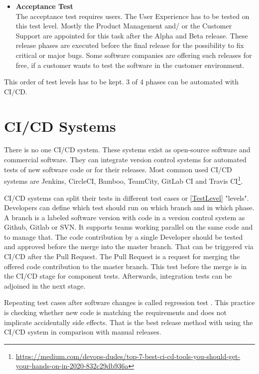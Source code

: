\begin{itemize}
\item \textbf{Acceptance Test} \\
The acceptance test requires users. The User Experience has to be tested on this test level. Mostly the Product Management and/ or the Customer Support are appointed for this task after the Alpha and Beta release. These release phases are executed before the final release for the possibility to fix critical or major bugs.
Some software companies are offering such releases for free, if a customer wants to test the software in the customer environment.
\end{itemize}
This order of test levels has to be kept. 3 of 4 phases can be automated with \gls{CI/CD}. 

\section{CI/CD Systems} \label{CI-CD}

There is no one \gls{CI/CD} system. These systems exist as open-source software and commercial software. They can integrate version control systems for automated tests of new software code or for their releases. Most common used \gls{CI/CD} systems are Jenkins, CircleCI, Bamboo, TeamCity, GitLab CI and Travis CI\footnote{\url{https://medium.com/devops-dudes/top-7-best-ci-cd-tools-you-should-get-your-hands-on-in-2020-832c29db936a}}.

\gls{CI/CD} systems can split their tests in different test cases or \ref{TestLevel} "levels". Developers can define which test should run on which branch and in which phase. A branch is a labeled software version with code in a version control system as Github, Gitlab or SVN. It supports teams working parallel on the same code and to manage that. The code contribution by a single Developer should be tested and approved before the merge into the master branch. That can be triggered via \gls{CI/CD} after the Pull Request. The Pull Request is a request for merging the offered code contribution to the master branch. This test before the merge is in the \gls{CI/CD} stage for component tests. Afterwards, integration tests can be adjoined in the next stage.

Repeating test cases after software changes is called regression test \cite[~p.98]{Spillner2019}. This practice is checking whether new code is matching the requirements and does not implicate accidentally side effects. That is the best release method with using the \gls{CI/CD} system in comparison with manual releases.

